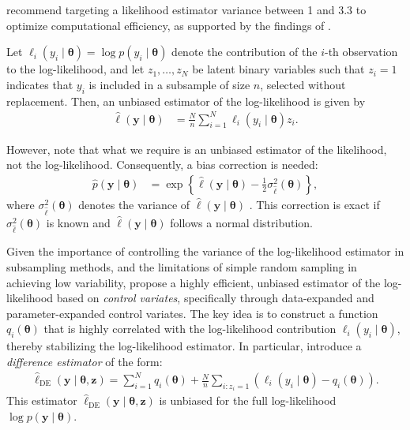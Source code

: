 \cite{quiroz2018subsampling} recommend targeting a likelihood estimator variance between 1 and 3.3 to optimize computational efficiency, as supported by the findings of \cite{pitt2012some}.

Let \( \ell_i(y_i \mid \boldsymbol{\theta}) = \log p(y_i \mid \boldsymbol{\theta}) \) denote the contribution of the \( i \)-th observation to the log-likelihood, and let \( z_1, \dots, z_N \) be latent binary variables such that \( z_i = 1 \) indicates that \( y_i \) is included in a subsample of size \( n \), selected without replacement. Then, an unbiased estimator of the log-likelihood is given by
\begin{align*}
	\hat{\ell}(\mathbf{y} \mid \boldsymbol{\theta}) & = \frac{N}{n} \sum_{i=1}^N \ell_i(y_i \mid \boldsymbol{\theta}) z_i.
\end{align*}

However, note that what we require is an unbiased estimator of the likelihood, not the log-likelihood. Consequently, a bias correction is needed:
\begin{align*}
	\hat{p}(\mathbf{y} \mid \boldsymbol{\theta}) & = \exp\left\{ \hat{\ell}(\mathbf{y} \mid \boldsymbol{\theta}) - \frac{1}{2} \sigma^2_{\hat{\ell}}(\boldsymbol{\theta}) \right\},
\end{align*}
where \( \sigma^2_{\hat{\ell}}(\boldsymbol{\theta}) \) denotes the variance of \( \hat{\ell}(\mathbf{y} \mid \boldsymbol{\theta}) \) \cite{ceperley1999penalty}. This correction is exact if \( \sigma^2_{\hat{\ell}}(\boldsymbol{\theta}) \) is known and \( \hat{\ell}(\mathbf{y} \mid \boldsymbol{\theta}) \) follows a normal distribution.

Given the importance of controlling the variance of the log-likelihood estimator in subsampling methods, and the limitations of simple random sampling in achieving low variability, \cite{quiroz2019speeding} propose a highly efficient, unbiased estimator of the log-likelihood based on \textit{control variates}, specifically through data-expanded and parameter-expanded control variates. 
The key idea is to construct a function \( q_i(\boldsymbol{\theta}) \) that is highly correlated with the log-likelihood contribution \( \ell_i(y_i \mid \boldsymbol{\theta}) \), thereby stabilizing the log-likelihood estimator. In particular, \cite{quiroz2019speeding} introduce a \textit{difference estimator} of the form:
\begin{align*}
	\hat{\ell}_{\mathrm{DE}}(\mathbf{y} \mid \boldsymbol{\theta}, \mathbf{z}) = \sum_{i=1}^N q_i(\boldsymbol{\theta}) + \frac{N}{n} \sum_{i: z_i = 1} \left( \ell_i(y_i \mid \boldsymbol{\theta}) - q_i(\boldsymbol{\theta}) \right).
\end{align*}
This estimator \( \hat{\ell}_{\mathrm{DE}}(\mathbf{y} \mid \boldsymbol{\theta}, \mathbf{z}) \) is unbiased for the full log-likelihood \( \log p(\mathbf{y} \mid \boldsymbol{\theta}) \).

